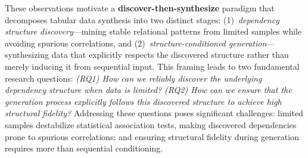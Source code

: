 These observations motivate a \textbf{discover-then-synthesize} paradigm that decomposes tabular data synthesis into two distinct stages: (1)~\textit{dependency structure discovery}---mining stable relational patterns from limited samples while avoiding spurious correlations, and (2)~\textit{structure-conditioned generation}---synthesizing data that explicitly respects the discovered structure rather than merely inducing it from sequential input.
This framing leads to two fundamental research questions: 
\textit{(RQ1) How can we reliably discover the underlying dependency structure when data is limited?}
\textit{(RQ2) How can we ensure that the generation process explicitly follows this discovered structure to achieve high structural fidelity?}
Addressing these questions poses significant challenges: limited samples destabilize statistical association tests, making discovered dependencies prone to spurious correlations; and ensuring structural fidelity during generation requires more than sequential conditioning.

